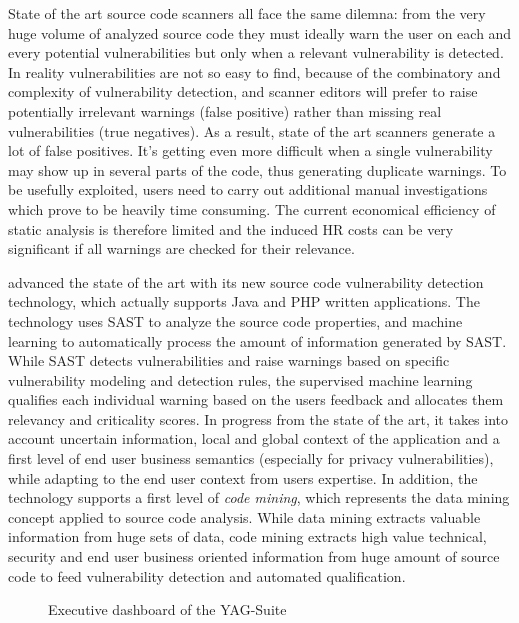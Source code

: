 \documentclass[a4paper,11pt]{article}
\begin{document}
State of the art source code scanners all face the same dilemna: from the very huge volume of analyzed source code they must ideally warn the user on each and every potential vulnerabilities but only when a relevant vulnerability is detected. In reality vulnerabilities are not so easy to find, because of the combinatory and complexity of vulnerability detection, and scanner editors will prefer to raise potentially irrelevant warnings (false positive) rather than missing real vulnerabilities (true negatives). As a result, state of the art scanners generate a lot of false positives. It's getting even more difficult when a single vulnerability may show up in several parts of the code, thus generating duplicate warnings. 
To be usefully exploited, users need to carry out additional manual investigations which prove to be heavily time consuming. The current economical efficiency of static analysis is therefore limited and the induced HR costs can be very significant if all warnings are checked for their relevance.

\YAGshort{} advanced the state of the art with its new source code vulnerability detection technology, which actually supports Java and PHP written applications. The technology uses SAST to analyze the source code properties, and machine learning to automatically process the amount of information generated by SAST. While SAST detects vulnerabilities and raise warnings based on specific vulnerability modeling and detection rules, the supervised machine learning qualifies each individual warning based on the users feedback and allocates them relevancy and criticality scores. In progress from the state of the art, it takes into account uncertain information, local and global context of the application and a first level of end user business semantics (especially for privacy vulnerabilities), while adapting to the end user context from users expertise. In addition, the technology supports a first level of \emph{code mining}, which represents the data mining concept applied to source code analysis. While data mining extracts valuable information from huge sets of data, code mining extracts high value technical, security and end user business oriented information from huge amount of source code to feed vulnerability detection and automated qualification.

\begin{figure}[tp]
  \begin{center}
  \vspace{-5mm}
  \caption{Executive dashboard of the YAG-Suite}
  \label{fig:yagoverview}
  \end{center}
  \end{figure}
\end{document}
